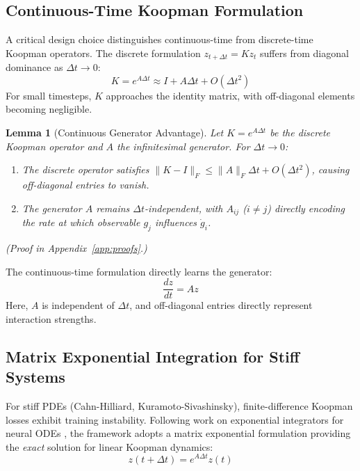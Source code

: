 \documentclass{article}
\newtheorem{lemma}{Lemma}
\theoremstyle{remark}
\begin{document}
\subsection{Continuous-Time Koopman Formulation}

A critical design choice distinguishes continuous-time from discrete-time Koopman operators. The discrete formulation $z_{t+\Delta t} = K z_t$ suffers from diagonal dominance as $\Delta t \rightarrow 0$:
\begin{equation}
K = e^{A\Delta t} \approx I + A\Delta t + O(\Delta t^2)
\end{equation}
For small timesteps, $K$ approaches the identity matrix, with off-diagonal elements becoming negligible.

\begin{lemma}[Continuous Generator Advantage]
\label{lem:continuous}
Let $K = e^{A\Delta t}$ be the discrete Koopman operator and $A$ the infinitesimal generator. For $\Delta t \to 0$:
\begin{enumerate}
    \item[(i)] The discrete operator satisfies $\|K - I\|_F \leq \|A\|_F \Delta t + O(\Delta t^2)$, causing off-diagonal entries to vanish.
    \item[(ii)] The generator $A$ remains $\Delta t$-independent, with $A_{ij}$ ($i \neq j$) directly encoding the rate at which observable $g_j$ influences $\dot{g}_i$.
\end{enumerate}
(Proof in Appendix~\ref{app:proofs}.)
\end{lemma}

The continuous-time formulation directly learns the generator:
\begin{equation}
\frac{dz}{dt} = Az
\end{equation}
Here, $A$ is independent of $\Delta t$, and off-diagonal entries directly represent interaction strengths.

\subsection{Matrix Exponential Integration for Stiff Systems}

For stiff PDEs (Cahn-Hilliard, Kuramoto-Sivashinsky), finite-difference Koopman losses exhibit training instability. Following work on exponential integrators for neural ODEs \citep{jolicoeurmartineau2024stiffnode, schaeffer2025structurepreserving}, the framework adopts a matrix exponential formulation providing the \emph{exact} solution for linear Koopman dynamics:
\begin{equation}
z(t + \Delta t) = e^{A\Delta t} z(t)
\label{eq:expm_propagation}
\end{equation}
\end{document}
